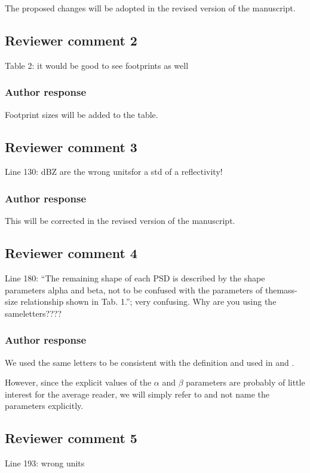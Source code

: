 \documentclass[11pt]{scrartcl}
\begin{document}
The proposed changes will be adopted in the revised version of the manuscript.

\subsection*{Reviewer comment 2}

Table 2:  it would be good to see footprints as well

\subsubsection*{Author response}

Footprint sizes will be added to the table.

\subsection*{Reviewer comment 3}
Line 130: dBZ are the wrong unitsfor a std of a reflectivity!

\subsubsection*{Author response}
This will be corrected in the revised version of the manuscript.

\subsection*{Reviewer comment 4}

Line 180: “The remaining shape of each PSD is described by the shape parameters
alpha and beta, not to be confused with the parameters of themass-size
relationship shown in Tab. 1.”; very confusing. Why are you using the
sameletters????

\subsubsection*{Author response}

We used the same  letters to be consistent with the definition and used in
\cite{delanoe14} and \cite{cazenave18}.

However, since the explicit values of the $\alpha$ and $\beta$ parameters are
probably of little interest for the average reader, we will simply refer to
\cite{cazenave18} and not name the parameters explicitly.

\subsection*{Reviewer comment 5}
Line 193: wrong units 
\end{document}
